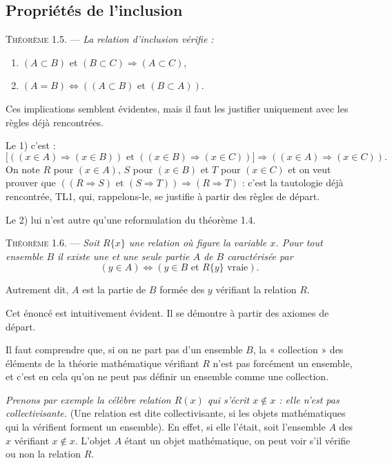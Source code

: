 \subsection*{Propriétés de l'inclusion}

\medskip\noindent\textsc{Théorème 1.5.} --- \emph{La relation d'inclusion vérifie :}
\begin{enumerate}[label=\arabic*)]
\item $(A\subset B)$ et $(B\subset C)\Rightarrow(A\subset C)$,
\item $(A=B)\Leftrightarrow((A\subset B)\text{ et }(B\subset A))$.
\end{enumerate}

Ces implications semblent évidentes, mais il faut les justifier uniquement avec les règles déjà rencontrées.

Le 1) c'est :
\[
\bigl[((x\in A)\Rightarrow(x\in B))\text{ et }((x\in B)\Rightarrow(x\in C))\bigr]
\Rightarrow((x\in A)\Rightarrow(x\in C)).
\]
On note $R$ pour $(x\in A)$, $S$ pour $(x\in B)$ et $T$ pour $(x\in C)$ et on veut prouver que $((R\Rightarrow S)\text{ et }(S\Rightarrow T))\Rightarrow(R\Rightarrow T)$ : c'est la tautologie déjà rencontrée, TL1, qui, rappelons-le, se justifie à partir des règles de départ.

Le 2) lui n'est autre qu'une reformulation du théorème 1.4. \bookend

\medskip\noindent\textsc{Théorème 1.6.} --- \emph{Soit $R\{x\}$ une relation où figure la variable $x$. Pour tout ensemble $B$ il existe une et une seule partie $A$ de $B$ caractérisée par
\[
(y\in A)\Leftrightarrow(y\in B\text{ et }R\{y\}\text{ vraie}).
\]}

Autrement dit, $A$ est la partie de $B$ formée des $y$ vérifiant la relation $R$.

Cet énoncé est intuitivement évident. Il se démontre à partir des axiomes de départ.

Il faut comprendre que, si on ne part pas d'un ensemble $B$, la « collection » des éléments de la théorie mathématique vérifiant $R$ n'est pas forcément un ensemble, et c'est en cela qu'on ne peut pas définir un ensemble comme une collection.

\emph{Prenons par exemple la célèbre relation $R(x)$ qui s'écrit $x\notin x$ : elle n'est pas collectivisante.} (Une relation est dite collectivisante, si les objets mathématiques qui la vérifient forment un ensemble). En effet, si elle l'était, soit l'ensemble $A$ des $x$ vérifiant $x\notin x$. L'objet $A$ étant un objet mathématique, on peut voir s'il vérifie ou non la relation $R$.

